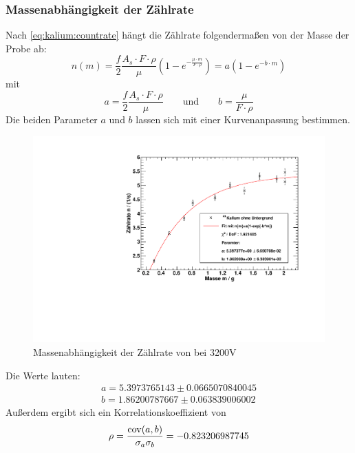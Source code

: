 \subsubsection{Massenabhängigkeit der Zählrate} %
Nach \eqref{eq:kalium:countrate} hängt die Zählrate folgendermaßen von der Masse der Probe ab: %
\begin{equation}
  n(m) = \frac{f}{2} \frac{A_s \cdot F \cdot \rho}{\mu} \left( 1 - e^{- \frac{\mu \cdot m}{F \cdot \rho}} \right) = a(1-e^{-b \cdot m})
\end{equation}
mit
\begin{equation}
  a = \frac{f}{2} \frac{A_s \cdot F \cdot \rho}{\mu} \qquad \text{und} \qquad b = \frac{\mu}{F \cdot \rho}
\end{equation}
Die beiden Parameter $a$ und $b$ lassen sich mit einer Kurvenanpassung bestimmen.
\begin{figure}[H]
\begin{center}
  \includegraphics[width=15cm]{../img/Kalium40_Massenabhaengigkeit.pdf}
  \caption[Massenabhängigkeit der Zählrate von \kalium]{Massenabhängigkeit der Zählrate von \kalium bei 3200V}
  \label{figureLabel}
\end{center}
\end{figure}
Die Werte lauten:
\begin{gather}
  a = 5.3973765143 \pm 0.0665070840045 \\ %
  b = 1.86200787667	\pm	0.063839006002
\end{gather}
Außerdem ergibt sich ein Korrelationskoeffizient von
\begin{equation}
  \rho = \frac{\operatorname{cov}(a, b)}{\sigma_a \sigma_b} = -0.823206987745
\end{equation}

